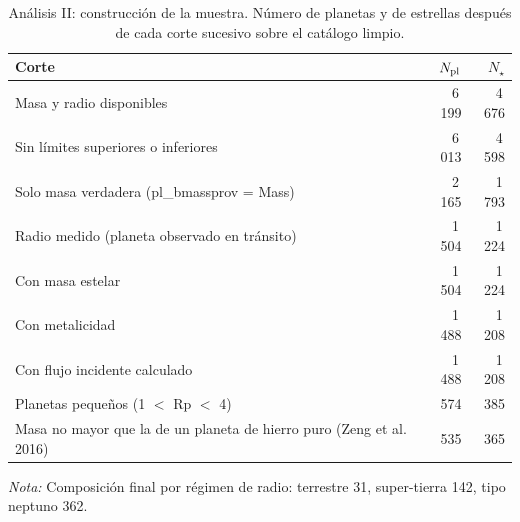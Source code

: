 \begin{table}[htbp]
    \centering
    \caption{Análisis II: construcción de la muestra. Número de planetas y de estrellas después de cada corte sucesivo sobre el catálogo limpio.}
    \label{tab:A2-T1}
    \small
    \begin{tabular}{p{}rr}
    \toprule
    Corte & $N_{\rm pl}$ & $N_\star$ \\
    \midrule
    Masa y radio disponibles & 6\,199 & 4\,676 \\
    Sin límites superiores o inferiores & 6\,013 & 4\,598 \\
    Solo masa verdadera (pl\_bmassprov = Mass) & 2\,165 & 1\,793 \\
    Radio medido (planeta observado en tránsito) & 1\,504 & 1\,224 \\
    Con masa estelar & 1\,504 & 1\,224 \\
    Con metalicidad & 1\,488 & 1\,208 \\
    Con flujo incidente calculado & 1\,488 & 1\,208 \\
    Planetas pequeños (1 $<$ Rp $<$ 4) & 574 & 385 \\
    Masa no mayor que la de un planeta de hierro puro (Zeng et al. 2016) & 535 & 365 \\
    \bottomrule
    \end{tabular}
    \par\smallskip
    {\footnotesize\textit{Nota:} Composición final por régimen de radio: terrestre 31, super-tierra 142, tipo neptuno 362.}
\end{table}
